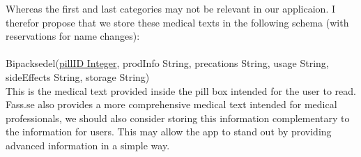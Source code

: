 \documentclass{article}
\begin{document}
\noindent Whereas the first and last categories may not be relevant in our applicaion. I therefor propose that we store these medical texts in the following schema (with reservations for name changes): \\\\Bipacksedel(\underline{pillID Integer}, prodInfo String, precations String, usage String, sideEffects String, storage String)\\

\noindent This is the medical text provided inside the pill box intended for the user to read. Fass.se also provides a more comprehensive medical text intended for medical professionals, we should also consider storing this information complementary to the information for users. This may allow the app to stand out by providing advanced information in a simple way. 
\end{document}

